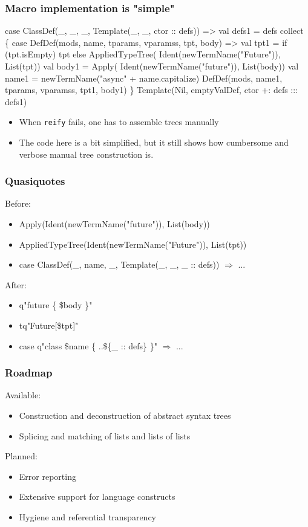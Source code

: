 \documentclass[svgnames,hyperref={bookmarks=false}]{beamer}
\begin{document}
\begin{frame}[fragile]
\frametitle{Macro implementation is "simple"}

\begin{semiverbatim}
case ClassDef(_, _, _, Template(_, _, ctor :: defs)) =>
  val defs1 = defs collect \{
    case DefDef(mods, name, tparams, vparamss, tpt, body) =>
      val tpt1 = if (tpt.isEmpty) tpt else AppliedTypeTree(
        Ident(newTermName("Future")), List(tpt))
      val body1 = Apply(
        Ident(newTermName("future")), List(body))
      val name1 = newTermName("async" + name.capitalize)
      DefDef(mods, name1, tparams, vparamss, tpt1, body1)
  \}
  Template(Nil, emptyValDef, ctor +: defs ::: defs1)
\end{semiverbatim}

\begin{itemize}
\item When \texttt{reify} fails, one has to assemble trees manually
\item The code here is a bit simplified, but it still shows how cumbersome and verbose manual tree construction is.
\end{itemize}
\end{frame}

\begin{frame}[fragile]
\frametitle{Quasiquotes}

Before:
\begin{itemize}
\item Apply(Ident(newTermName("future")), List(body))
\item AppliedTypeTree(Ident(newTermName("Future")), List(tpt))
\item case ClassDef(\_, name, \_, Template(\_, \_, \_ :: defs)) $\Rightarrow$ ...
\end{itemize}
\vskip25pt
After:
\begin{itemize}
\item q"future \{ \$body \}"
\item tq"Future[\$tpt]"
\item case q"class \$name \{ ..\$\{\_ :: defs\} \}" $\Rightarrow$ ...
\end{itemize}
\end{frame}

\begin{frame}[fragile]
\frametitle{Roadmap}

Available:
\begin{itemize}
\item Construction and deconstruction of abstract syntax trees
\item Splicing and matching of lists and lists of lists
\end{itemize}
\vskip25pt
Planned:
\begin{itemize}
\item Error reporting
\item Extensive support for language constructs
\item Hygiene and referential transparency
\end{itemize}
\end{frame}
\end{document}
